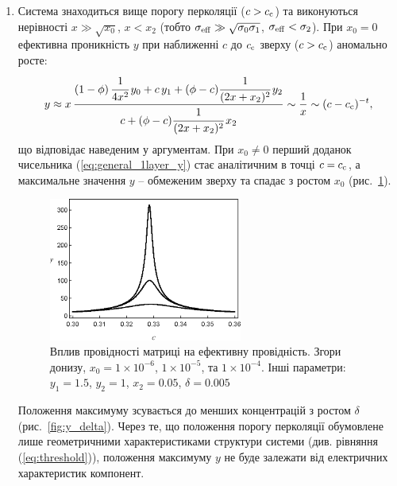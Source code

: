 \documentclass[14pt,twoside]{vakthesis}
\begin{document}
\begin{enumerate}
	\item Система знаходиться вище порогу перколяції ($c > c_{\rm c}$) та виконуються нерівності $x \gg \sqrt{x_0}$, $x < x_2$ (тобто $\sigma_{\rm eff} \gg \sqrt{\sigma_0 \sigma_1}$, $\sigma_{\rm eff} < \sigma_2$).
	При $x_0 = 0$ ефективна проникність $y$ при наближенні $c$ до $c_{\rm c}$ зверху ($c > c_{\rm c}$) аномально росте:
	\begin{equation}\label{eq:general_1layer_y_x00_cc}
	y \approx x\,
	\frac{(1-\phi)\, \cfrac{1}{4x^2}\,y_0 +
		c\, y_1 +(\phi-c)\cfrac{1}{(2x+x_2)^2}\,y_2}{c +(\phi -c)\cfrac{1}{(2x+x_2)^2}\, x_2} \sim \frac{1}{x} \sim (c - c_{\rm c})^{-t},
	\end{equation}
	що відповідає наведеним у \cite{Efros1976} аргументам. 
	При $x_0 \neq 0$ перший доданок чисельника (\ref{eq:general_1layer_y}) стає аналітичним в точці $c=c_{\rm c}$, а максимальне значення $y$ -- обмеженим 
	зверху та спадає з ростом $x_0$ (рис.~\ref{fig:y_x0}).
	\begin{figure}[!b]
		\centering
		\includegraphics[width=0.6\textwidth]{percolation-eps-x0.eps}
		\caption{\label{fig:y_x0}
			Вплив провідності матриці на ефективну провідність.
			Згори донизу, $x_0 = 1 \times 10^{-6}$, $1 \times 10^{-5}$,
			та $1 \times 10^{-4}$. Інші параметри: $y_1 = 1.5$,
			$y_2 = 1$, $x_2 = 0.05$, $\delta = 0.005$}
	\end{figure} 
	Положення
	максимуму зсувається до менших концентрацій з ростом $\delta$
	(рис.~\ref{fig:y_delta}). Через те, що положення порогу перколяції обумовлене лише геометричними характеристиками структури системи (див. рівняння (\ref{eq:threshold})), положення максимуму $y$ не буде залежати від електричних характеристик компонент.
	

\end{enumerate}
\end{document}
